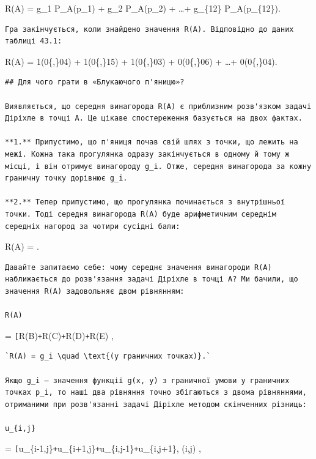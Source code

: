 \documentclass[
  ukrainian,
]{article}
\begin{document}
R(A) = g\_1 P\_A(p\_1) + g\_2 P\_A(p\_2) + \dots + g\_\{12\}
P\_A(p\_\{12\}).

\begin{verbatim}
Гра закінчується, коли знайдено значення R(A). Відповідно до даних таблиці 43.1:
\end{verbatim}

R(A) = 1\cdot(0\{,\}04) + 1\cdot(0\{,\}15) + 1\cdot(0\{,\}03) +
0\cdot(0\{,\}06) + \dots + 0\cdot(0\{,\}04).

\begin{verbatim}
## Для чого грати в «Блукаючого п'яницю»?

Виявляється, що середня винагорода R(A) є приблизним розв'язком задачі Діріхле в точці A. Це цікаве спостереження базується на двох фактах.

**1.** Припустимо, що п'яниця почав свій шлях з точки, що лежить на межі. Кожна така прогулянка одразу закінчується в одному й тому ж місці, і він отримує винагороду g_i. Отже, середня винагорода за кожну граничну точку дорівнює g_i.

**2.** Тепер припустимо, що прогулянка починається з внутрішньої точки. Тоді середня винагорода R(A) буде арифметичним середнім середніх нагород за чотири сусідні бали:
\end{verbatim}

R(A) = \bigl[R(B) + R(C) + R(D) + R(E)\bigr].

\begin{verbatim}
Давайте запитаємо себе: чому середнє значення винагороди R(A) наближається до розв'язання задачі Діріхле в точці A? Ми бачили, що значення R(A) задовольняє двом рівнянням:

R(A)
\end{verbatim}

=
\bigl\texttt{{[}}R(B)\texttt{+}R(C)\texttt{+}R(D)\texttt{+}R(E)\bigr{]}
\quad {},

\begin{verbatim}
`R(A) = g_i \quad \text{(у граничних точках)}.`

Якщо g_i — значення функції g(x, y) з граничної умови у граничних точках p_i, то наші два рівняння точно збігаються з двома рівняннями, отриманими при розв'язанні задачі Діріхле методом скінченних різниць:

u_{i,j}
\end{verbatim}

=
\bigl\texttt{{[}}u\_\{i-1,j\}\texttt{+}u\_\{i+1,j\}\texttt{+}u\_\{i,j-1\}\texttt{+}u\_\{i,j+1\}\bigr{]},
\quad (i,j) ,
\end{document}
